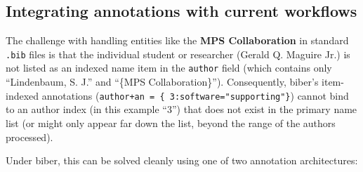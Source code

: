 \documentclass[12pt, twoside]{article}
\newcommand{\fname}[1]{\texttt{#1}}
\begin{document}
\subsection{Integrating annotations with current workflows}
\label{sec:integratingAnnotationsWithCurrentWorkflows}

The challenge with handling entities like the \textbf{MPS Collaboration} in standard \fname{.bib} files is that the individual student or researcher (\eg Gerald Q. Maguire Jr.) is not listed as an indexed name item in the \texttt{author} field (which contains only \enquote{Lindenbaum, S. J.} and \enquote{\{MPS Collaboration\}}). Consequently, biber’s item-indexed annotations (\texttt{author+an = \{ 3:software="supporting"\}}) cannot bind to an author index (in this example \enquote{3}) that does not exist in the primary name list (or might only appear far down the list, \ie beyond the range of the authors processed).

Under biber, this can be solved cleanly using one of two annotation architectures:
\end{document}
